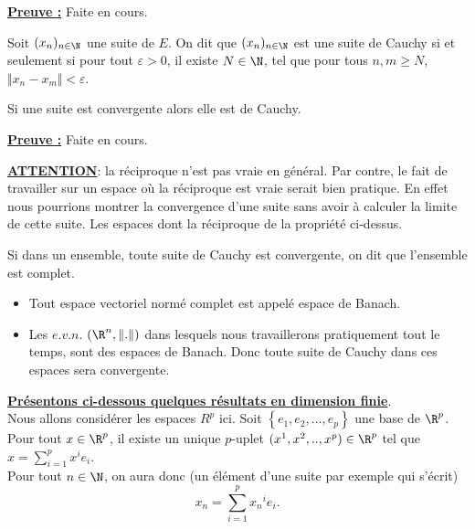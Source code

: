 \documentclass[class=report,crop=false]{standalone}
\begin{document}
\noindent \underline{\bf Preuve :}
Faite en cours.
 
\begin{definition}
\textcolor[rgb]{0.73,0.00,0.00}{ 
Soit $(x_n)_{n \in \N}$ une suite de $E$. On dit que $(x_n)_{n \in \N}$ est une suite de Cauchy si et seulement si
pour tout $\varepsilon >0$, il existe  $N \in \N$, tel
que pour tous $n,m \geq N$, $\Vert x_n -x_m \Vert < \varepsilon$.
}
\end{definition}

\begin{proposition}
\textcolor[rgb]{0.50,0.00,0.25}{ 
Si une suite est convergente alors elle est de Cauchy.
}
\end{proposition}

\noindent \underline{\bf Preuve :}
Faite en cours.

\begin{remarque*}
\textcolor[rgb]{0.00,0.00,1.00}{\textbf{\underline{ATTENTION}}: la réciproque n'est pas vraie en général. Par contre, le fait de travailler sur un espace où la réciproque est vraie serait bien pratique. En effet nous pourrions montrer la convergence d'une suite
sans avoir à calculer la limite de cette suite. Les espaces dont la réciproque de la propriété ci-dessus.}
\end{remarque*}

\begin{definition}
\textcolor[rgb]{0.73,0.00,0.00}{ 
Si dans un ensemble, toute suite de Cauchy est convergente, on dit que l'ensemble est complet.
}
\end{definition}


\begin{remarque*}
\textcolor[rgb]{0.00,0.00,1.00}{
\begin{itemize}
\item Tout espace vectoriel normé complet est appelé espace de Banach.
\item Les $e.v.n.$ $(\R^n, \Vert . \Vert)$ dans lesquels nous travaillerons pratiquement tout le temps, sont des
espaces de Banach. Donc toute suite de Cauchy dans ces espaces sera convergente.
\end{itemize}}
\end{remarque*}
$ $\\
$ $\\

\noindent \underline{\bf Présentons ci-dessous quelques résultats en dimension finie}. \\
Nous allons considérer les espaces $R^p$ ici. Soit $\left\lbrace e_1, e_2,...,e_p \right\rbrace $ une base de $\R^p$. Pour tout 
$x \in \R^p$, il existe un unique $p$-uplet $(x^1,x^2,..,x^p) \in \R^p$ tel que $x= \displaystyle \sum_{i=1}^p x^i e_i$. \\
Pour tout $n \in  \N$, on aura donc (un élément d'une suite par exemple qui s'écrit)
\begin{equation*}
x_n= \displaystyle \sum_{i=1}^p x{_n}^i e_i.
\end{equation*}
\end{document}
